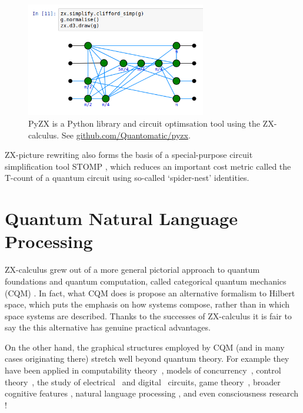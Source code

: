 \documentclass[11pt]{article}
\theoremstyle{definition}
\begin{document}
{\begin{figure}[]
  \centering
  \includegraphics[width=0.7\textwidth]{pyzx2.png}
  \caption{PyZX is a Python library and circuit optimsation tool using the ZX-calculus. See \url{github.com/Quantomatic/pyzx}.}
  \label{fig:pyzx}
\end{figure}


ZX-picture rewriting also forms the basis of a special-purpose circuit simplification tool STOMP \cite{de2020fast}, which reduces an important cost metric called the T-count of a quantum circuit using so-called `spider-nest' identities.


\section{Quantum Natural Language Processing}\label{sec:QNLP}%

ZX-calculus grew out of a more general pictorial approach to quantum foundations and quantum computation, called categorical quantum mechanics (CQM) \cite{AC1, Kindergarten}. In fact, what CQM does is propose an alternative formalism to Hilbert space, which puts the emphasis on how systems compose, rather than in which space systems are described. Thanks to the successes of ZX-calculus it is fair to say the this alternative has genuine practical advantages.  

On the other hand, the graphical structures employed by CQM (and in many cases originating there) stretch well beyond quantum theory. For example they have been applied in
computability theory~\cite{pavlovic2013monoidal}, models of concurrency~\cite{Sobocinski:2010aa}, control theory~\cite{Baez2014a,Bonchi2015}, the study of electrical~\cite{BaezFongElec} and digital~\cite{GhicaCircuit} circuits, game theory~\cite{ghani2016compositional}, broader cognitive features \cite{ConcSpacI}, natural language processing \cite{CSC, FrobMeanI}, and even consciousness research \cite{seanconscious, wangconscious}!

}
\end{document}
